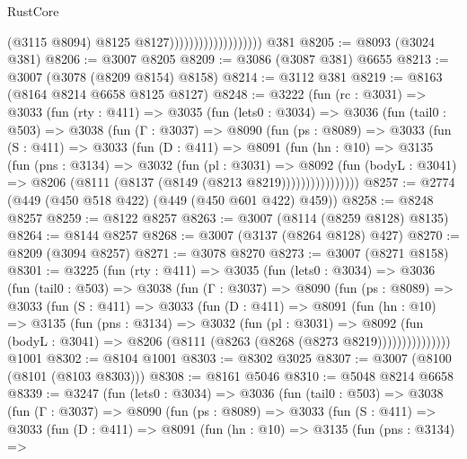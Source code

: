 \begin{lexlean}{RustCore}
\begin{coremodule}
                                          (@3115 @8094)
                                          @8125
                                          @8127)))))))))))))))))))
    @381
@8205 := @8093 (@3024 @381)
@8206 := @3007 @8205
@8209 := @3086 (@3087 @381) @6655
@8213 := @3007 (@3078 (@8209 @8154) @8158)
@8214 := @3112 @381
@8219 := @8163 (@8164 @8214 @6658 @8125 @8127)
@8248 := @3222
    (fun (rc : @3031) =>
    @3033
      (fun (rty : @411) =>
      @3035
        (fun (lets0 : @3034) =>
        @3036
          (fun (tail0 : @503) =>
          @3038
            (fun (Γ : @3037) =>
            @8090
              (fun (ps : @8089) =>
              @3033
                (fun (S : @411) =>
                @3033
                  (fun (D : @411) =>
                  @8091
                    (fun (hn : @10) =>
                    @3135
                      (fun (pns : @3134) =>
                      @3032
                        (fun (pl : @3031) =>
                        @8092
                          (fun (bodyL : @3041) =>
                          @8206 (@8111 (@8137 (@8149 (@8213 @8219))))))))))))))))
@8257 := @2774 (@449 (@450 @518 @422) (@449 (@450 @601 @422) @459))
@8258 := @8248 @8257
@8259 := @8122 @8257
@8263 := @3007 (@8114 (@8259 @8128) @8135)
@8264 := @8144 @8257
@8268 := @3007 (@3137 (@8264 @8128) @427)
@8270 := @8209 (@3094 @8257)
@8271 := @3078 @8270
@8273 := @3007 (@8271 @8158)
@8301 := @3225
    (fun (rty : @411) =>
    @3035
      (fun (lets0 : @3034) =>
      @3036
        (fun (tail0 : @503) =>
        @3038
          (fun (Γ : @3037) =>
          @8090
            (fun (ps : @8089) =>
            @3033
              (fun (S : @411) =>
              @3033
                (fun (D : @411) =>
                @8091
                  (fun (hn : @10) =>
                  @3135
                    (fun (pns : @3134) =>
                    @3032
                      (fun (pl : @3031) =>
                      @8092
                        (fun (bodyL : @3041) =>
                        @8206 (@8111 (@8263 (@8268 (@8273 @8219)))))))))))))))
    @1001
@8302 := @8104 @1001
@8303 := @8302 @3025
@8307 := @3007 (@8100 (@8101 (@8103 @8303)))
@8308 := @8161 @5046
@8310 := @5048 @8214 @6658
@8339 := @3247
    (fun (lets0 : @3034) =>
    @3036
      (fun (tail0 : @503) =>
      @3038
        (fun (Γ : @3037) =>
        @8090
          (fun (ps : @8089) =>
          @3033
            (fun (S : @411) =>
            @3033
              (fun (D : @411) =>
              @8091
                (fun (hn : @10) =>
                @3135
                  (fun (pns : @3134) =>

\end{coremodule}
\end{lexlean}
